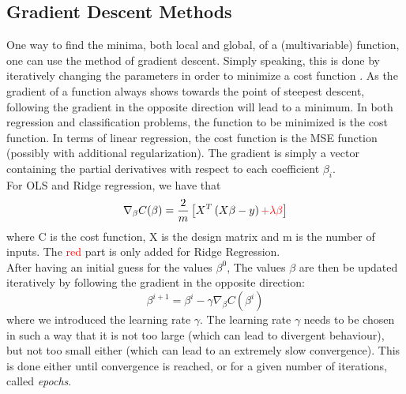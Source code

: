 \documentclass[11pt,a4paper,titlepage]{article}
\begin{document}
\subsection{Gradient Descent Methods}
One way to find the minima, both local and global, of a (multivariable) function, one can use the method of gradient descent. Simply speaking, this is done by iteratively changing the parameters in order to minimize a cost function \citep{handsOnMachineLearning}. As the gradient of a function always shows towards the point of steepest descent, following the gradient in the opposite direction will lead to a minimum. In both regression and classification problems, the function to be minimized is the cost function. In terms of linear regression, the cost function is the MSE function (possibly with additional regularization). The gradient is simply a vector containing the partial derivatives with respect to each coefficient $\beta_i$.\\
For OLS and Ridge regression, we have that 
\begin{equation}
     \nabla_\beta C(\beta)=\frac{2}{m} \left[X^T \left(X\beta-y\right)\textcolor{red}{+\lambda\beta} \right]
\end{equation}
where C is the cost function, X is the design matrix and m is the number of inputs. The \textcolor{red}{red} part is only added for Ridge Regression. \\
After having an initial guess for the values $\beta^0$, The values $\beta$ are then be updated iteratively by following the gradient in the opposite direction:
\begin{equation}\label{Updatescheme}
\beta^{i+1}=\beta^{i}- \gamma \nabla_\beta C(\beta^{i})
\end{equation}
where we introduced the learning rate $\gamma$. The learning rate $\gamma$ needs to be chosen in such a way that it is not too large (which can lead to divergent behaviour), but not too small either (which can lead to an extremely slow convergence). This is done either until convergence is reached, or for a given number of iterations, called \textit{epochs}.
\end{document}
